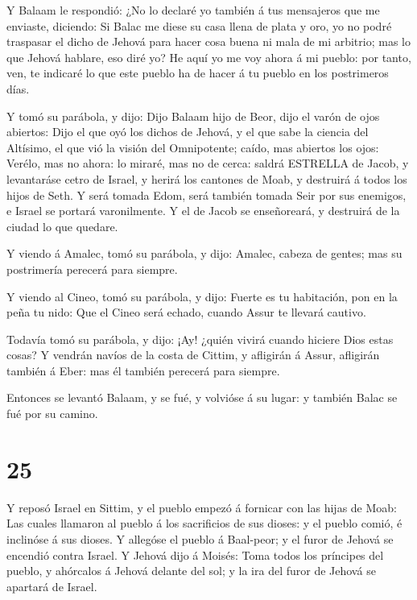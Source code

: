  Y Balaam le respondió: ¿No lo declaré yo también á tus
mensajeros que me enviaste, diciendo:  Si Balac me diese su
casa llena de plata y oro, yo no podré traspasar el dicho de Jehová para
hacer cosa buena ni mala de mi arbitrio; mas lo que Jehová hablare, eso
diré yo?  He aquí yo me voy ahora á mi pueblo: por tanto,
ven, te indicaré lo que este pueblo ha de hacer á tu pueblo en los
postrimeros días.

 Y tomó su parábola, y dijo: Dijo Balaam hijo de Beor, dijo
el varón de ojos abiertos:  Dijo el que oyó los dichos de
Jehová, y el que sabe la ciencia del Altísimo, el que vió la visión del
Omnipotente; caído, mas abiertos los ojos:  Verélo, mas no
ahora: lo miraré, mas no de cerca: saldrá ESTRELLA de Jacob, y
levantaráse cetro de Israel, y herirá los cantones de Moab, y destruirá
á todos los hijos de Seth.  Y será tomada Edom, será
también tomada Seir por sus enemigos, e Israel se portará varonilmente.
 Y el de Jacob se enseñoreará, y destruirá de la ciudad lo
que quedare.

 Y viendo á Amalec, tomó su parábola, y dijo: Amalec,
cabeza de gentes; mas su postrimería perecerá para siempre.

 Y viendo al Cineo, tomó su parábola, y dijo: Fuerte es tu
habitación, pon en la peña tu nido:  Que el Cineo será
echado, cuando Assur te llevará cautivo.

 Todavía tomó su parábola, y dijo: ¡Ay! ¿quién vivirá
cuando hiciere Dios estas cosas?  Y vendrán navíos de la
costa de Cittim, y afligirán á Assur, afligirán también á Eber: mas él
también perecerá para siempre.

 Entonces se levantó Balaam, y se fué, y volvióse á su
lugar: y también Balac se fué por su camino.

\hypertarget{section-24}{%
\section{25}\label{section-24}}

 Y reposó Israel en Sittim, y el pueblo empezó á fornicar
con las hijas de Moab:  Las cuales llamaron al pueblo á los
sacrificios de sus dioses: y el pueblo comió, é inclinóse á sus dioses.
 Y allegóse el pueblo á Baal-peor; y el furor de Jehová se
encendió contra Israel.  Y Jehová dijo á Moisés: Toma todos
los príncipes del pueblo, y ahórcalos á Jehová delante del sol; y la ira
del furor de Jehová se apartará de Israel.

